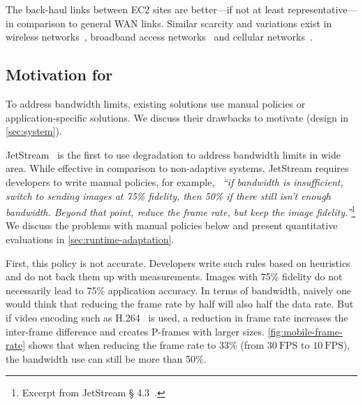 The back-haul links between EC2 sites are better---if not at least
representative---in comparison to general WAN links. Similar scarcity and
variations exist in wireless networks~\cite{biswas2015large}, broadband access
networks~\cite{grover2013peeking, sundaresan2014bismark} and cellular
networks~\cite{nikravesh2014mobile}.

\subsection{Motivation for \sysname{}}
\label{subsec:motivation}




To address bandwidth limits, existing solutions use manual policies or
application-specific solutions. We discuss their drawbacks to motivate
\sysname{} (design in \autoref{sec:system}).

 JetStream~\cite{rabkin2014aggregation} is
the first to use degradation to address bandwidth limits in wide area. While
effective in comparison to non-adaptive systems, JetStream requires developers
to write manual policies, for example, ~\textit{``if bandwidth is insufficient,
  switch to sending images at 75\% fidelity, then 50\% if there still isn't
  enough bandwidth. Beyond that point, reduce the frame rate, but keep the image
  fidelity.''}\footnote{Excerpt from JetStream \S
  4.3~\cite{rabkin2014aggregation}.} We discuss the problems with manual
policies below and present quantitative evaluations in
\autoref{sec:runtime-adaptation}.

First, this policy is not accurate.  Developers write such rules based on
heuristics and do not back them up with measurements. Images with 75\% fidelity
do not necessarily lead to 75\% application accuracy. In terms of bandwidth,
naively one would think that reducing the frame rate by half will also half the
data rate. But if video encoding such as H.264~\cite{richardson2011h} is used, a
reduction in frame rate increases the inter-frame difference and creates
P-frames with larger sizes. \autoref{fig:mobile-frame-rate} shows that when
reducing the frame rate to 33\% (from \(30~\text{FPS}\) to \(10~\text{FPS}\)),
the bandwidth use can still be more than 50\%.

